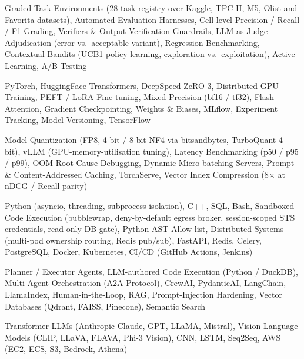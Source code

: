 \documentclass[letter,10pt]{article}
\begin{document}
 Graded Task Environments (28-task registry over Kaggle, TPC-H, M5, Olist and Favorita datasets), Automated Evaluation Harnesses, Cell-level Precision / Recall / F1 Grading, Verifiers \& Output-Verification Guardrails, LLM-as-Judge Adjudication (error vs.\ acceptable variant), Regression Benchmarking, Contextual Bandits (UCB1 policy learning, exploration vs.\ exploitation), Active Learning, A/B Testing\par\vspace{2pt}

 PyTorch, HuggingFace Transformers, DeepSpeed ZeRO-3, Distributed GPU Training, PEFT / LoRA Fine-tuning, Mixed Precision (bf16 / tf32), Flash-Attention, Gradient Checkpointing, Weights \& Biases, MLflow, Experiment Tracking, Model Versioning, TensorFlow\par\vspace{2pt}

 Model Quantization (FP8, 4-bit / 8-bit NF4 via bitsandbytes, TurboQuant 4-bit), vLLM (GPU-memory-utilisation tuning), Latency Benchmarking (p50 / p95 / p99), OOM Root-Cause Debugging, Dynamic Micro-batching Servers, Prompt \& Content-Addressed Caching, TorchServe, Vector Index Compression (8$\times$ at nDCG / Recall parity)\par\vspace{2pt}

 Python (asyncio, threading, subprocess isolation), C++, SQL, Bash, Sandboxed Code Execution (bubblewrap, deny-by-default egress broker, session-scoped STS credentials, read-only DB gate), Python AST Allow-list, Distributed Systems (multi-pod ownership routing, Redis pub/sub), FastAPI, Redis, Celery, PostgreSQL, Docker, Kubernetes, CI/CD (GitHub Actions, Jenkins)\par\vspace{2pt}

 Planner / Executor Agents, LLM-authored Code Execution (Python / DuckDB), Multi-Agent Orchestration (A2A Protocol), CrewAI, PydanticAI, LangChain, LlamaIndex, Human-in-the-Loop, RAG, Prompt-Injection Hardening, Vector Databases (Qdrant, FAISS, Pinecone), Semantic Search\par\vspace{2pt}

 Transformer LLMs (Anthropic Claude, GPT, LLaMA, Mistral), Vision-Language Models (CLIP, LLaVA, FLAVA, Phi-3 Vision), CNN, LSTM, Seq2Seq, AWS (EC2, ECS, S3, Bedrock, Athena)
\end{document}
